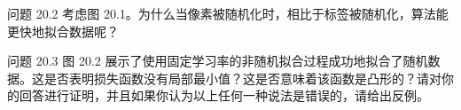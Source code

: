问题 20.2 考虑图 20.1。为什么当像素被随机化时，相比于标签被随机化，算法能更快地拟合数据呢？

问题 20.3 图 20.2 展示了使用固定学习率的非随机拟合过程成功地拟合了随机数据。这是否表明损失函数没有局部最小值？这是否意味着该函数是凸形的？请对你的回答进行证明，并且如果你认为以上任何一种说法是错误的，请给出反例。










































